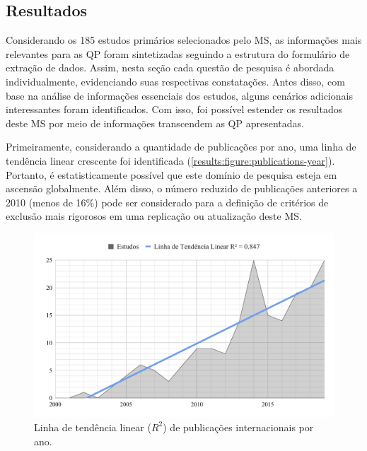 \subsection{Resultados}
\label{ms:resultados}

Considerando os 185 estudos primários selecionados pelo MS, as informações mais relevantes para as QP foram sintetizadas seguindo a estrutura do formulário de extração de dados. Assim, nesta seção cada questão de pesquisa é abordada individualmente, evidenciando suas respectivas constatações. Antes disso, com base na análise de informações essenciais dos estudos, alguns cenários adicionais interessantes foram identificados. Com isso, foi possível estender os resultados deste MS por meio de informações transcendem as QP apresentadas.

Primeiramente, considerando a quantidade de publicações por ano, uma linha de tendência linear crescente foi identificada (\autoref{results:figure:publications-year}). Portanto, é estatisticamente possível que este domínio de pesquisa esteja em ascensão globalmente. Além disso, o número reduzido de publicações anteriores a 2010 (menos de 16\%) pode ser considerado para a definição de critérios de exclusão mais rigorosos em uma replicação ou atualização deste MS.

\begin{figure}[htbp]
\caption{Linha de tendência linear ($R^2$) de publicações internacionais por ano.}
\label{results:figure:publications-year}
\centerline{\includegraphics[width=\columnwidth]{images/publications-sm-timeline.pdf}}
\fautor
\end{figure}


